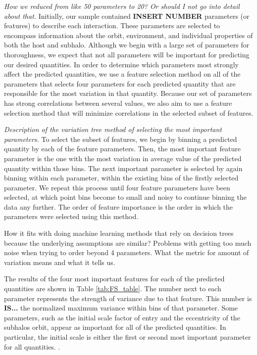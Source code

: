 \documentclass[fleqn,usenatbib]{mnras}
\begin{document}
\textit{How we reduced from like 50 parameters to 20? Or should I not go into detail about that.} Initially, our sample contained \textbf{INSERT NUMBER} parameters (or features) to describe each interaction. These parameters are selected to encompass information about the orbit, environment, and individual properties of both the host and subhalo. Although we begin with a large set of parameters for thoroughness, we expect that not all parameters will be important for predicting our desired quantities. In order to determine which parameters most strongly affect the predicted quantities, we use a feature selection method on all of the parameters that selects four parameters for each predicted quantity that are responsible for the most variation in that quantity. Because our set of parameters has strong correlations between several values, we also aim to use a feature selection method that will minimize correlations in the selected subset of features.

\textit{Description of the variation tree method of selecting the most important parameters.}
To select the subset of features, we begin by binning a predicted quantity by each of the feature parameters. Then, the most important feature parameter is the one with the most variation in average value of the predicted quantity within those bins. The next important parameter is selected by again binning within each parameter, within the existing bins of the firstly selected parameter. We repeat this process until four feature parameters have been selected, at which point bins become to small and noisy to continue binning the data any further. The order of feature importance is the order in which the parameters were selected using this method.
 
 {How it fits with doing machine learning methods that rely on decision trees because the underlying assumptions are similar? Problems with getting too much noise when trying to order beyond 4 parameters. What the metric for amount of variation means and what it tells us.}

The results of the four most important features for each of the predicted quantities are shown in Table \ref{tab:FS_table}. The number next to each parameter represents the strength of variance due to that feature. This number is \textbf{IS...} the normalized maximum variance within bins of that parameter. Some parameters, such as the initial scale factor of entry and the eccentricity of the subhalos orbit, appear as important for all of the predicted quantities. In particular, the initial scale is either the first or second most important parameter for all quantities. .
\end{document}
